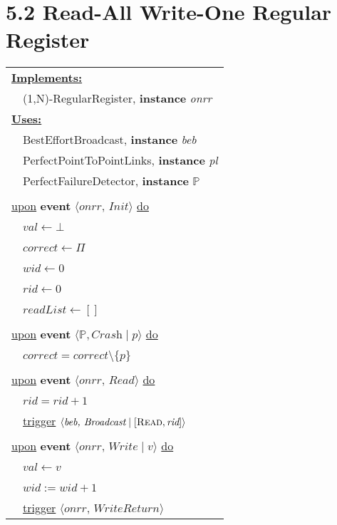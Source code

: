 \documentclass{article}
\begin{document}
	\section*{5.2 Read-All Write-One Regular Register}
	\begin{adjustwidth}{2em}{2em}
		\begin{center}
			\begin{tabular}{l}
				\underline{\textbf{Implements:}} \\
				\ \ (1,N)-RegularRegister, \textbf{instance} \textit{onrr} \\
				\underline{\textbf{Uses:}} \\
				\ \ BestEffortBroadcast, \textbf{instance} \textit{beb} \\
				\ \ PerfectPointToPointLinks, \textbf{instance} \textit{pl} \\
				\ \ PerfectFailureDetector, \textbf{instance} $\mathbb{P}$ \\
				\\
				\underline{upon} \textbf{event} $\langle \textit{onrr, Init} \rangle$ \underline{do} \\ 
				\ \ $val \leftarrow \bot$ \\
				\ \ $correct \leftarrow \Pi$ \\
				\ \ $wid \leftarrow 0$ \\
				\ \ $rid \leftarrow 0$ \\
				\ \ $readList \leftarrow []$ \\
				\\
				\underline{upon} \textbf{event} $\langle \mathbb{P}, \textit{Crash} \mid p \rangle$ \underline{do} \\
				\ \ $correct = correct \setminus \{ p \}$ \\
				\\
				\underline{upon} \textbf{event} $\langle \textit{onrr, Read} \rangle$ \underline{do} \\
				\ \ $rid = rid + 1$ \\
				\ \ \underline{trigger} $\langle \textit{beb, Broadcast} \mid [\textsc{Read}, \textit{rid}] \rangle$ \\
				\\
				\underline{upon} \textbf{event} $\langle \textit{onrr, Write} \mid v \rangle$ \underline{do} \\
				\ \ $val \leftarrow v$ \\
				\ \ $wid := wid + 1$ \\
				\ \ \underline{trigger} $\langle \textit{onrr, WriteReturn} \rangle$ \\

\end{tabular}
\end{center}
\end{adjustwidth}
\end{document}
